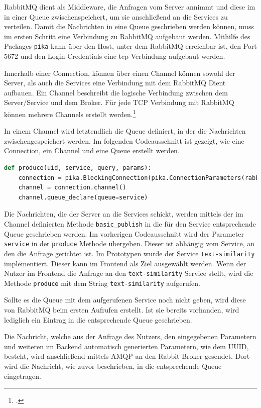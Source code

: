 RabbitMQ dient als Middleware, die Anfragen vom Server annimmt und diese im in einer Queue zwischenspeichert, um sie anschließend an die Services zu verteilen. Damit die Nachrichten in eine Queue geschrieben werden können, muss im ersten Schritt eine Verbindung zu RabbitMQ aufgebaut werden. Mithilfe des Packages \texttt{pika} kann über den Host, unter dem RabbitMQ erreichbar ist, den Port 5672 und den Login-Credentials eine \ac{tcp} Verbindung aufgebaut werden.

Innerhalb einer Connection, können über einen Channel können sowohl der Server, als auch die Services eine Verbindung mit dem RabbitMQ Dient aufbauen. Ein Channel beschreibt die logische Verbindung zwischen dem Server/Service und dem Broker. Für jede TCP Verbindung mit RabbitMQ können mehrere Channels erstellt werden.\footcite{dossot2014rabbitmq}

In einem Channel wird letztendlich die Queue definiert, in der die Nachrichten zwischengespeichert werden. Im folgenden Codeausschnitt ist gezeigt, wie eine Connection, ein Channel und eine Queue erstellt werden.

\begin{lstlisting}[language=Python]
def produce(uid, service, query, params):
    connection = pika.BlockingConnection(pika.ConnectionParameters(rabbit_host, 5672, '/', credentials))
    channel = connection.channel()
    channel.queue_declare(queue=service)
\end{lstlisting}

Die Nachrichten, die der Server an die Services schickt, werden mittels der im Channel definierten Methode \texttt{basic\_{}publish} in die für den Service entsprechende Queue geschrieben werden. Im vorherigen Codeausschnitt wird der Parameter \texttt{service} in der \texttt{produce} Methode übergeben. Dieser ist abhängig vom Service, an den die Anfrage gerichtet ist. Im Prototypen wurde der Service \texttt{text-similarity} implementiert. Dieser kann im Frontend als Ziel ausgewählt werden. Wenn der Nutzer im Frontend die Anfrage an den \texttt{text-similarity} Service stellt, wird die Methode \texttt{produce} mit dem String \texttt{\glqq text-similarity\grqq{}} aufgerufen.

Sollte es die Queue mit dem aufgerufenen Service noch nicht geben, wird diese von RabbitMQ beim ersten Aufrufen erstellt. Ist sie bereits vorhanden, wird lediglich ein Eintrag in die entsprechende Queue geschrieben.

Die Nachricht, welche aus der Anfrage des Nutzers, den eingegebenen Parametern und weiteren im Backend automatisch generierten Parametern, wie dem UUID, besteht, wird anschließend mittels AMQP an den Rabbit Broker gesendet. Dort wird die Nachricht, wie zuvor beschrieben, in die entsprechende Queue eingetragen. 

